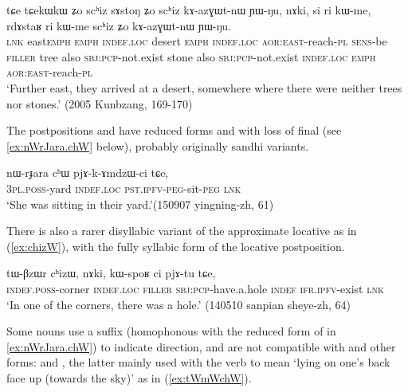 \begin{exe}
\ex \label{ex:schiz.kazGWtnW}
 \gll  tɕe tɕekɯ\redp{}kɯ ʑo scʰiz sɤstoŋ ʑo scʰiz kɤ-azɣɯt-nɯ ɲɯ-ŋu, nɤki, si ri kɯ-me, rdɤstaʁ ri kɯ-me scʰiz ʑo kɤ-azɣɯt-nɯ ɲɯ-ŋu. \\
 \textsc{lnk} east\redp{}\textsc{emph} \textsc{emph} \textsc{indef}.\textsc{loc} desert \textsc{emph} \textsc{indef}.\textsc{loc} \textsc{aor}:\textsc{east}-reach-\textsc{pl} \textsc{sens}-be \textsc{filler} tree also \textsc{sbj}:\textsc{pcp}-not.exist stone also \textsc{sbj}:\textsc{pcp}-not.exist \textsc{indef}.\textsc{loc}  \textsc{emph}  \textsc{aor}:\textsc{east}-reach-\textsc{pl} \\
 \glt `Further east, they arrived at  a desert, somewhere where there were neither trees nor stones.' (2005 Kunbzang, 169-170)
\end{exe}

The postpositions  and  have reduced forms  and  with loss of final  (see \ref{ex:nWrJara.chW} below), probably originally sandhi variants.

\begin{exe}
\ex \label{ex:nWrJara.chW}
\gll nɯ-rɟara cʰɯ pjɤ-k-ɤmdzɯ-ci tɕe, \\
\textsc{3pl}.\textsc{poss}-yard \textsc{indef}.\textsc{loc} \textsc{pst}.\textsc{ipfv}-\textsc{peg}-sit-\textsc{peg} \textsc{lnk} \\
\glt `She was sitting in their yard.'(150907 yingning-zh, 61)
\end{exe}

There is also a rarer disyllabic variant of the approximate locative  as in (\ref{ex:chizW}), with the fully syllabic form  of the locative postposition.

\begin{exe}
\ex \label{ex:chizW}
\gll tɯ-βzɯr cʰizɯ, nɤki, kɯ-spoʁ ci pjɤ-tu tɕe,  \\
\textsc{indef}.\textsc{poss}-corner \textsc{indef}.\textsc{loc} \textsc{filler} \textsc{sbj}:\textsc{pcp}-have.a.hole \textsc{indef} \textsc{ifr}.\textsc{ipfv}-exist \textsc{lnk} \\
\glt `In one of the corners, there was a hole.' (140510 sanpian sheye-zh, 64)
\end{exe}

Some nouns use a suffix  (homophonous with the reduced form of  in \ref{ex:nWrJara.chW}) to indicate direction, and are not compatible with  and other forms:  and , the latter mainly used with the verb  to mean `lying on one's back face up (towards the sky)' as in (\ref{ex:tWmWchW}).

